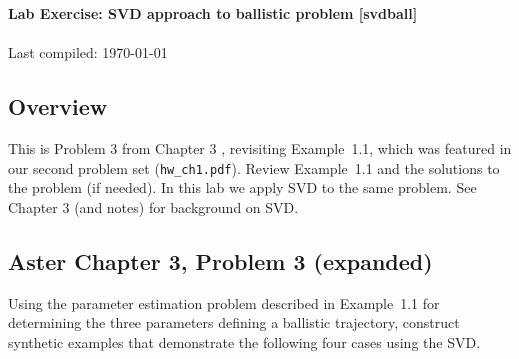 \documentclass[11pt,titlepage,fleqn]{article}
\begin{document}

\begin{spacing}{1.2}
\centering
{\large \bf Lab Exercise: SVD approach to ballistic problem [svdball]} \\
\cltag\ \\
Last compiled: \today
\end{spacing}


\subsection*{Overview}

This is Problem 3 from Chapter 3 \citep{Aster}, revisiting Example~1.1, which was featured in our second problem set (\verb+hw_ch1.pdf+). Review Example~1.1 and the solutions to the problem (if needed). In this lab we apply SVD to the same problem. See Chapter 3 (and notes) for background on SVD.


\subsection*{Aster Chapter 3, Problem 3 (expanded)}

Using the parameter estimation problem described in Example~1.1 for determining the three parameters defining a ballistic trajectory, construct synthetic examples that demonstrate the following four cases using the SVD.
\end{document}
